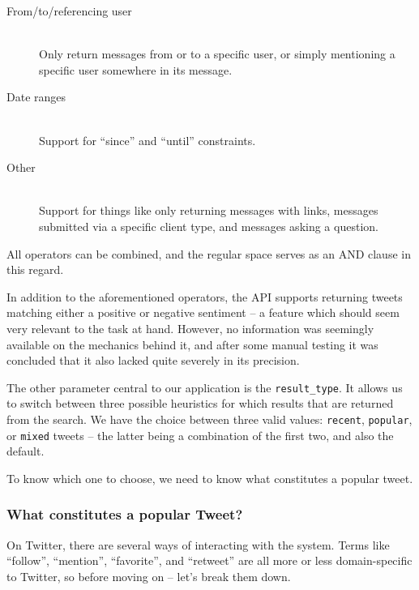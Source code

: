 \begin{description}
  \item[From/to/referencing user] \hfill \\
    Only return messages from or to a specific user, or simply mentioning a specific user somewhere in its message.
  \item[Date ranges] \hfill \\
    Support for ``since'' and ``until'' constraints.
  \item[Other] \hfill \\
    Support for things like only returning messages with links, messages submitted via a specific client type, and messages asking a question.
\end{description}

All operators can be combined, and the regular space serves as an AND clause in this regard.

In addition to the aforementioned operators, the API supports returning tweets matching either a positive or negative sentiment -- a feature which should seem very relevant to the task at hand. However, no information was seemingly available on the mechanics behind it, and after some manual testing it was concluded that it also lacked quite severely in its precision.

The other parameter central to our application is the \texttt{result\_type}. It allows us to switch between three possible heuristics for which results that are returned from the search. We have the choice between three valid values: \texttt{recent}, \texttt{popular}, or \texttt{mixed} tweets -- the latter being a combination of the first two, and also the default.

To know which one to choose, we need to know what constitutes a popular tweet.

\subsubsection{What constitutes a popular Tweet?}

On Twitter, there are several ways of interacting with the system. Terms like ``follow'', ``mention'', ``favorite'', and ``retweet'' are all more or less domain-specific to Twitter, so before moving on -- let's break them down.

